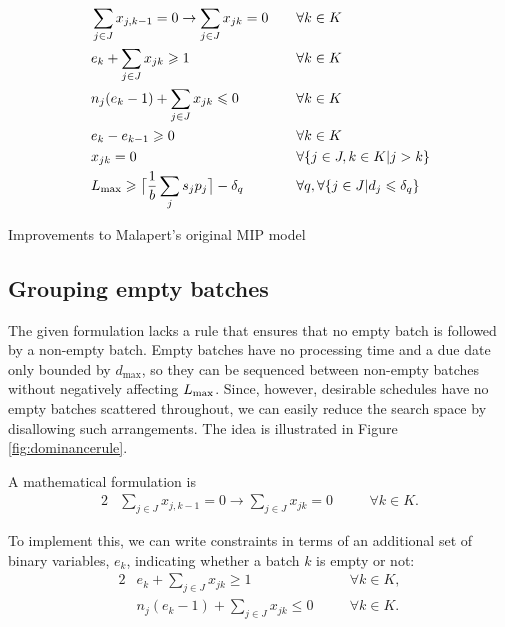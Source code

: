 \documentclass[13pt, letterpaper, oneside]{book}
\begin{document}
\begin{model}[h]
\begin{alignat}{2}
& \sum_{j \in J} x_{j,k-1} = 0 \rightarrow \sum_{j \in J} x_{jk} = 0 \quad &&
\forall k \in K \\
& e_k + \sum_{j \in J} x_{jk} \geqslant 1 \quad && \forall k \in K \\
& n_j (e_k-1) + \sum_{j \in J} x_{jk} \leqslant 0 \quad && \forall k \in K \\
& e_k - e_{k-1} \geqslant 0 \quad && \forall k \in K \\
& x_{jk} = 0 \quad && \forall \{j \in J, k \in K | j > k \} \\
& L_{\text{max}} \geqslant \big\lceil\frac{1}{b} \sum_{j} s_j
p_j\big\rceil - \delta_q \quad
&& \forall q, \forall \{ j \in J | d_j \leqslant \delta_q \}
\end{alignat}
\caption{Improvements to Malapert's original MIP model}
\label{model:improvedmip}
\end{model}

\subsection{Grouping empty batches} The given
formulation lacks a rule that ensures that no empty batch is followed by a
non-empty batch. Empty batches have no processing time and a due date only
bounded by $d_\text{max}$, so they can be sequenced between non-empty batches
without negatively affecting $L_{\text{max}}$. Since, however, desirable schedules have
no empty batches scattered throughout, we can easily reduce the search space by
disallowing such arrangements. The idea is illustrated in Figure
\ref{fig:dominancerule}.



A mathematical formulation is
\begin{alignat}{2}
& \sum_{j \in J} x_{j,k-1} = 0 \rightarrow \sum_{j \in J} x_{jk} = 0 \quad && \forall k \in K. \label{eq:emptybatch0}
\end{alignat}

To implement this, we can write constraints in terms of an additional  set of binary variables, $e_k$, indicating whether a batch $k$ is empty or not:
\begin{alignat}{2}
& e_k + \sum_{j \in J} x_{jk} \geq 1 \quad && \forall k \in K, \label{eq:emptybatch1} \\
& n_j (e_k-1) + \sum_{j \in J} x_{jk} \leq 0 \quad && \forall k \in K. \label{eq:emptybatch2}
\end{alignat}
\end{document}
